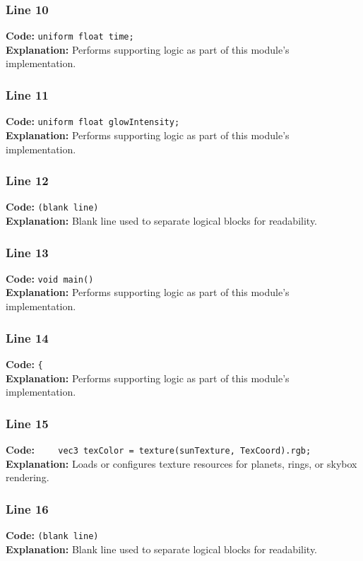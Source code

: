 \documentclass[11pt,a4paper]{article}
\begin{document}
\subsubsection*{Line 10}
\textbf{Code:} \verb|uniform float time;|\\
\textbf{Explanation:} Performs supporting logic as part of this module's implementation.

\subsubsection*{Line 11}
\textbf{Code:} \verb|uniform float glowIntensity;|\\
\textbf{Explanation:} Performs supporting logic as part of this module's implementation.

\subsubsection*{Line 12}
\textbf{Code:} \texttt{(blank line)}\\
\textbf{Explanation:} Blank line used to separate logical blocks for readability.

\subsubsection*{Line 13}
\textbf{Code:} \verb|void main()|\\
\textbf{Explanation:} Performs supporting logic as part of this module's implementation.

\subsubsection*{Line 14}
\textbf{Code:} \verb|{|\\
\textbf{Explanation:} Performs supporting logic as part of this module's implementation.

\subsubsection*{Line 15}
\textbf{Code:} \verb|    vec3 texColor = texture(sunTexture, TexCoord).rgb;|\\
\textbf{Explanation:} Loads or configures texture resources for planets, rings, or skybox rendering.

\subsubsection*{Line 16}
\textbf{Code:} \texttt{(blank line)}\\
\textbf{Explanation:} Blank line used to separate logical blocks for readability.
\end{document}
